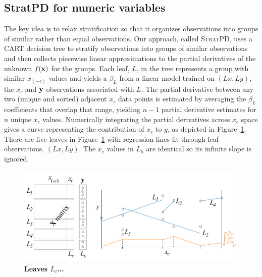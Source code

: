 \documentclass[12pt]{article}
\newcommand{\figref}[1]{Figure~\ref{#1}}
\newcommand{\spd}{\fontfamily{cmr}\textsc{\small StratPD}}
\newcommand{\xnc}{$x_{(-c)}$}
\begin{document}
\subsection{StratPD for numeric variables}

The key idea is to relax stratification so that it organizes observations into groups of similar rather than equal observations.  Our approach, called \spd, uses a CART decision tree \cite{CART} to stratify observations into  groups of similar observations and then collects piecewise linear approximations to the partial derivatives of the unknown $f(\bf x)$ for the groups. Each leaf, $L$, in the tree represents a group with similar \xnc{} values and yields a $\beta_L$ from a linear model trained on $(Lx, Ly)$, the $x_c$ and $\bf y$ observations associated with $L$.  The partial derivative between any two (unique and sorted) adjacent $x_c$ data points is estimated by averaging the $\beta_L$ coefficients that overlap that range, yielding $n-1$ partial derivative estimates for $n$ unique $x_c$ values.  Numerically integrating the partial derivatives across $x_c$ space gives a curve representing the contribution of $x_c$ to $y$, as depicted in \figref{fig:leaves}. There are five leaves in \figref{fig:leaves} with regression lines fit through leaf observations, $(Lx, Ly)$. The $x_c$ values in $L_5$ are identical so its infinite slope is ignored.

\begin{figure}[htbp]
\begin{center}
\includegraphics[scale=0.7]{images/leaves.pdf}
\caption{{\bf  Leaves $L_i$...}}
\label{fig:leaves}
\end{center}
\end{figure}
\end{document}
